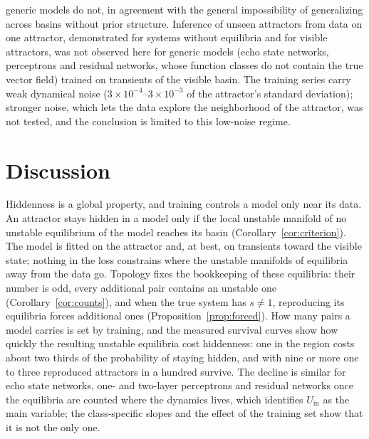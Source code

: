 \documentclass[aip,cha,reprint,amsmath,amssymb,longbibliography]{revtex4-2}
\theoremstyle{definition}
\newcommand{\Uin}{U_{\mathrm{in}}}
\begin{document}
generic models do not, in agreement with the general impossibility of generalizing across basins without prior
structure.\cite{Goring2024OOD} Inference of unseen attractors from data on one attractor, demonstrated for systems without
equilibria and for visible attractors,\cite{Rohm2021,Norton2025Unseen} was not observed here for generic models (echo state
networks, perceptrons and residual networks, whose function classes do not contain the true vector field) trained on
transients of the visible basin. The training series carry weak dynamical noise ($3\times10^{-4}$--$3\times10^{-3}$ of the
attractor's standard deviation); stronger noise, which lets the data explore the neighborhood of the attractor, was not
tested, and the conclusion is limited to this low-noise regime.

\section{Discussion}
\label{sec:discussion}

Hiddenness is a global property, and training controls a model only near its data. An attractor stays hidden in a model
only if the local unstable manifold of no unstable equilibrium of the model reaches its basin (Corollary~\ref{cor:criterion}).
The model is fitted on the attractor and, at best, on transients toward the visible state; nothing in the loss constrains
where the unstable manifolds of equilibria away from the data go. Topology fixes the bookkeeping of these equilibria: their
number is odd, every additional pair contains an unstable one (Corollary~\ref{cor:counts}), and when the true system has
$s\neq1$, reproducing its equilibria forces additional ones (Proposition~\ref{prop:forced}). How many pairs a model carries is
set by training, and the measured survival curves show how quickly the resulting unstable equilibria cost hiddenness: one in
the region costs about two thirds of the probability of staying hidden, and with nine or more one to three reproduced
attractors in a hundred survive. The decline is similar for echo state networks, one- and two-layer perceptrons and residual networks once
the equilibria are counted where the dynamics lives, which identifies $\Uin$ as the main variable; the class-specific slopes
and the effect of the training set show that it is not the only one.
\end{document}
